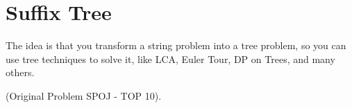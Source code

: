 \section{Suffix Tree} 
The idea is that you transform a string problem into a tree problem, so you can use tree techniques to solve it, like LCA, Euler Tour, DP on Trees, and many others.

(Original Problem SPOJ - TOP 10).
